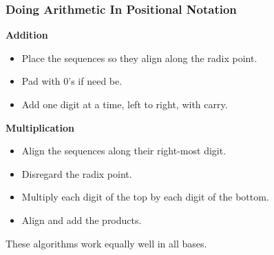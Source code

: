 \begin{frame}

\frametitle{Doing Arithmetic In Positional Notation}

\begin{minipage}{0.5\textwidth}

\begin{center}
\textbf{Addition}
\end{center}

\begin{itemize}

\item Place the sequences so they align along the radix point.

\item Pad with 0's if need be.

\item Add one digit at a time, left to right, with carry.

\end{itemize}

\end{minipage}%
\begin{minipage}{0.5\textwidth}

\begin{center}
\textbf{Multiplication}
\end{center}

\begin{itemize}

\item Align the sequences along their right-most digit.

\item Disregard the radix point.

\item Multiply each digit of the top by each digit of the bottom.

\item Align and add the products.

\end{itemize}

\end{minipage}

\begin{center}

These algorithms work equally well in all bases.

\end{center}

\end{frame}


